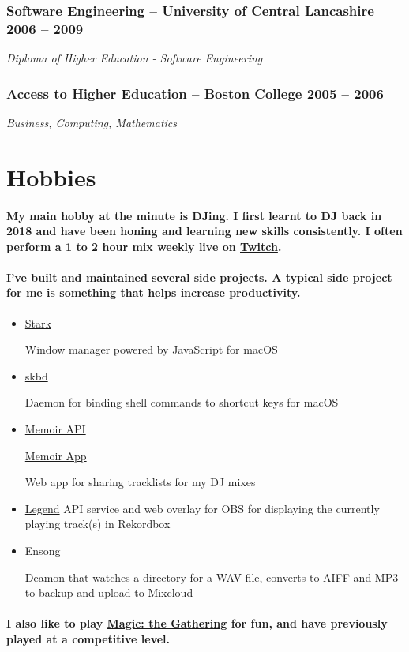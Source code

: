 \documentclass[a4paper]{article}
\newcommand{\datedsubsection}[2]{
  \subsubsection{#1 \hfill \textbf{#2}}
}
\newcommand{\languagetag}[1]{
  \raisebox{0.3\height}{\tiny #1}
}
\begin{document}
\datedsubsection{\textbf{Software Engineering} -- University of Central
Lancashire}{2006 -- 2009}
\textit{Diploma of Higher Education - Software Engineering}

\datedsubsection{\textbf{Access to Higher Education} -- Boston College}{2005 --
2006}
\textit{Business, Computing, Mathematics}

\section{Hobbies}
\paragraph{My main hobby at the minute is DJing. I first learnt to DJ back in
2018 and have been honing and learning new skills consistently. I often perform
a 1 to 2 hour mix weekly live on \href{https://twitch.tv/iamdjriff}{Twitch}.}

\paragraph{I've built and maintained several side projects. A typical side
project for me is something that helps increase productivity.}

\begin{itemize}
  \item \href{https://github.com/starkwm/stark}{Stark} \languagetag{(Swift)}
    Window manager powered by JavaScript for macOS
  \item \href{https://github.com/tombell/skbd}{skbd} \languagetag{(Swift)}
    Daemon for binding shell commands to shortcut keys for macOS
  \item \href{https://github.com/tombell/memoir}{Memoir API} \languagetag{(Go)}
    \href{https://github.com/tombell/memoir-app}{Memoir App}
    \languagetag{(TypeScript, Preact)} Web app for sharing tracklists for my DJ
    mixes
  \item \href{https://github.com/tombell/legend}{Legend} \languagetag{(Go,
    TypeScript, Preact)} API service and web overlay for OBS for displaying the
    currently playing track(s) in Rekordbox
  \item \href{https://github.com/tombell/ensong}{Ensong} \languagetag{(Go)}
    Deamon that watches a directory for a WAV file, converts to AIFF and MP3 to
    backup and upload to Mixcloud
\end{itemize}

\paragraph{I also like to play \href{https://magic.wizards.com/en}{Magic: the
Gathering} for fun, and have previously played at a competitive level.}
\end{document}
